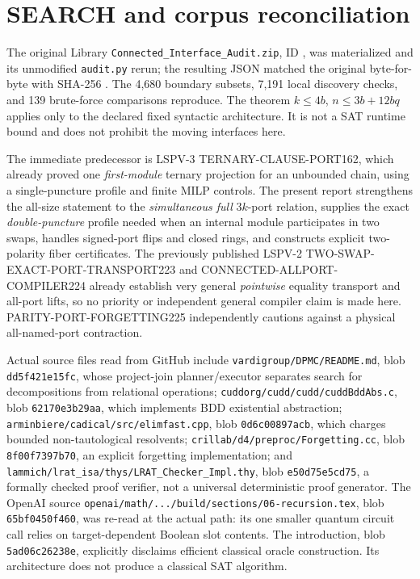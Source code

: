 \documentclass[11pt]{article}
\begin{document}
\section{SEARCH and corpus reconciliation}
The original Library \texttt{Connected\_Interface\_Audit.zip}, ID , was materialized and its unmodified \texttt{audit.py} rerun; the resulting JSON matched the original byte-for-byte with SHA-256 . The 4,680 boundary subsets, 7,191 local discovery checks, and 139 brute-force comparisons reproduce. The theorem $k\le4b$, $n\le3b+12bq$ applies only to the declared fixed syntactic architecture. It is not a SAT runtime bound and does not prohibit the moving interfaces here.

The immediate predecessor is LSPV-3 TERNARY-CLAUSE-PORT162, which already proved one \emph{first-module} ternary projection for an unbounded chain, using a single-puncture profile and finite MILP controls. The present report strengthens the all-size statement to the \emph{simultaneous full} $3k$-port relation, supplies the exact \emph{double-puncture} profile needed when an internal module participates in two swaps, handles signed-port flips and closed rings, and constructs explicit two-polarity fiber certificates. The previously published LSPV-2 TWO-SWAP-EXACT-PORT-TRANSPORT223 and CONNECTED-ALLPORT-COMPILER224 already establish very general \emph{pointwise} equality transport and all-port lifts, so no priority or independent general compiler claim is made here. PARITY-PORT-FORGETTING225 independently cautions against a physical all-named-port contraction.

Actual source files read from GitHub include \texttt{vardigroup/DPMC/README.md}, blob \texttt{dd5f421e15fc}, whose project-join planner/executor separates search for decompositions from relational operations; \texttt{cuddorg/cudd/cudd/cuddBddAbs.c}, blob \texttt{62170e3b29aa}, which implements BDD existential abstraction; \texttt{arminbiere/cadical/src/elimfast.cpp}, blob \texttt{0d6c00897acb}, which charges bounded non-tautological resolvents; \texttt{crillab/d4/preproc/Forgetting.cc}, blob \texttt{8f00f7397b70}, an explicit forgetting implementation; and \texttt{lammich/lrat\_isa/thys/LRAT\_Checker\_Impl.thy}, blob \texttt{e50d75e5cd75}, a formally checked proof verifier, not a universal deterministic proof generator. The OpenAI source \texttt{openai/math/.../build/sections/06-recursion.tex}, blob \texttt{65bf0450f460}, was re-read at the actual path: its one smaller quantum circuit call relies on target-dependent Boolean slot contents. The introduction, blob \texttt{5ad06c26238e}, explicitly disclaims efficient classical oracle construction. Its architecture does not produce a classical SAT algorithm.
\end{document}
